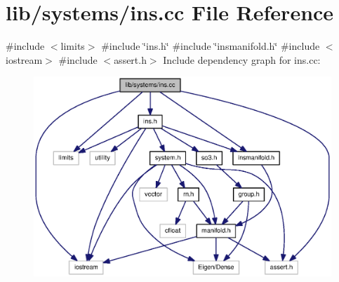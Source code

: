 \section{lib/systems/ins.cc \-File \-Reference}
\label{ins_8cc}
{\ttfamily \#include $<$limits$>$}\*
{\ttfamily \#include \char`\"{}ins.\-h\char`\"{}}\*
{\ttfamily \#include \char`\"{}insmanifold.\-h\char`\"{}}\*
{\ttfamily \#include $<$iostream$>$}\*
{\ttfamily \#include $<$assert.\-h$>$}\*
\-Include dependency graph for ins.\-cc\-:\nopagebreak
\begin{figure}[H]
\begin{center}
\leavevmode
\includegraphics[width=350pt]{ins_8cc__incl}
\end{center}
\end{figure}
